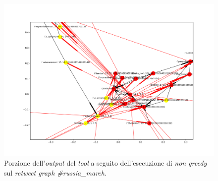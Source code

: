 \begin{figure}
\begin{center}
\includegraphics[scale=0.5]{images/russia_march_in_degree_probability_free.png}
\end{center}
\caption{Porzione dell'\textit{output} del \textit{tool} a seguito dell'esecuzione di \textit{non greedy} sul \textit{retweet graph \#russia\_march}.}
\label{fig:russianotgreedy}
\end{figure}






